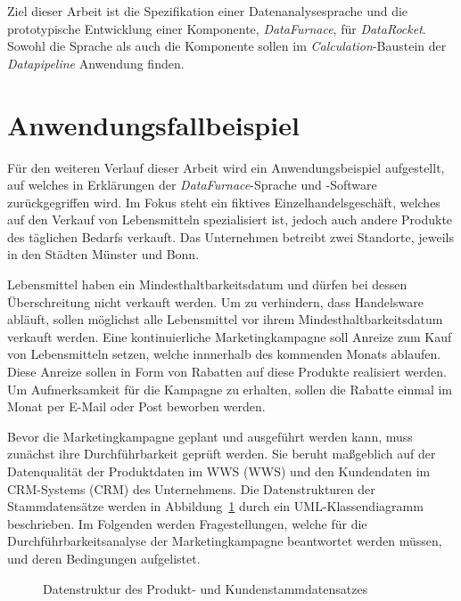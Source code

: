 \documentclass[
  language=german, %
  type=bachelor,%
  ngerman
]{isthesis}
\begin{document}
\begin{content}
	Ziel dieser Arbeit ist die Spezifikation einer Datenanalysesprache und die
	prototypische Entwicklung einer Komponente, \textit{DataFurnace}, für
	\textit{DataRocket}. Sowohl die Sprache als auch die Komponente sollen im
	\textit{Calculation}-Baustein der \textit{Datapipeline} Anwendung finden.

  \section{Anwendungsfallbeispiel}\label{sec:anwendungsfallbeispiel}

  Für den weiteren Verlauf dieser Arbeit wird ein Anwendungsbeispiel
  aufgestellt, auf welches in Erklärungen der \textit{DataFurnace}-Sprache und
  -Software zurückgegriffen wird. Im Fokus steht ein fiktives
  Einzelhandelsgeschäft, welches auf den Verkauf von Lebensmitteln
  spezialisiert ist, jedoch auch andere Produkte des täglichen Bedarfs
  verkauft. Das Unternehmen betreibt zwei Standorte, jeweils in den Städten
  Münster und Bonn.

  Lebensmittel haben ein Mindesthaltbarkeitsdatum und dürfen bei dessen
  Überschreitung nicht verkauft werden. Um zu verhindern, dass Handelsware
  abläuft, sollen möglichst alle Lebensmittel vor ihrem
  Mindesthaltbarkeitsdatum verkauft werden. Eine kontinuierliche
  Marketingkampagne soll Anreize zum Kauf von Lebensmitteln setzen, welche
  innnerhalb des kommenden Monats ablaufen. Diese Anreize sollen in Form von
  Rabatten auf diese Produkte realisiert werden. Um Aufmerksamkeit für die
  Kampagne zu erhalten, sollen die Rabatte einmal im Monat per E-Mail oder Post
  beworben werden. 

  Bevor die Marketingkampagne geplant und ausgeführt werden kann, muss zunächst
  ihre Durchführbarkeit geprüft werden. Sie beruht maßgeblich auf der
  Datenqualität der Produktdaten im \acrlong{WWS} (\acrshort{WWS}) und den
  Kundendaten im \acrlong{CRM}-Systems (\acrshort{CRM}) des Unternehmens. Die
  Datenstrukturen der Stammdatensätze werden in
  Abbildung~\ref{example-use-case-data} durch ein UML-Klassendiagramm
  beschrieben. Im Folgenden werden Fragestellungen, welche für die
  Durchführbarkeitsanalyse der Marketingkampagne beantwortet werden müssen, und
  deren Bedingungen aufgelistet.

  \begin{figure}
    \resizebox{250pt}{!}{}
    \caption{Datenstruktur des Produkt- und Kundenstammdatensatzes}\label{example-use-case-data}
  \end{figure}


\end{content}
\end{document}
